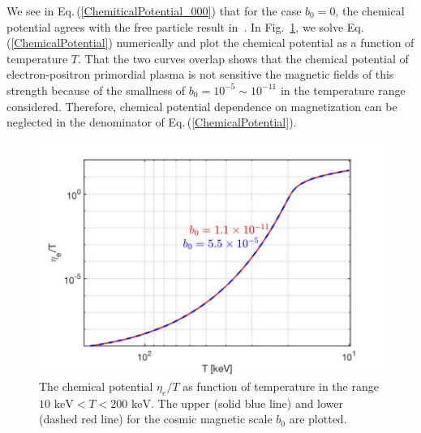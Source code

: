 \documentclass[universe,article,submit,moreauthors,pdftex,a4paper]{Definitions/mdpi}
\newcommand{\keV}{\text{ keV}}
\newcommand{\req}[1]{Eq.\,(\ref{#1})}
\newcommand*{\rf}[1]{Fig.~{\ref{#1}}}
\newcommand*{\xblue}{\color{blue}}
\begin{document}
We see in \req{ChemiticalPotential_000} that for the case $b_0=0$, the chemical potential agrees with the free particle result in~\cite{Chris:2023abc}. In \rf{chemical_fig}, we solve \req{ChemicalPotential} numerically and plot the chemical potential as a function of temperature $T$. {\xblue That the two curves overlap shows that the chemical potential of electron-positron primordial plasma is not sensitive the magnetic fields of this strength because of the smallness of $b_0=10^{-5}\sim10^{-11}$ in the temperature range considered. Therefore, chemical potential dependence on magnetization can be neglected in the denominator of \req{ChemicalPotential}}. 

\begin{figure}[ht]
\centering
\includegraphics[width=\textwidth]{./plots/ChemicalPotentialFinal_200keV.jpg}
\caption{The chemical potential $\eta_{e}/T$ as function of temperature in the range $10\keV<T<200\keV$. The upper (solid blue line) and lower (dashed red line) for the cosmic magnetic scale $b_{0}$ are plotted.}
\label{chemical_fig} 
\end{figure}

\end{document}
